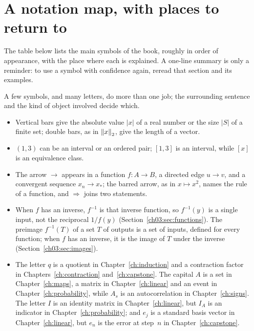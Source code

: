 \section{A notation map, with places to return to}\label{appC:sec:notation}
The table below lists the main symbols of the book, roughly in order of appearance, with the place where each is explained. A one-line summary is only a reminder: to use a symbol with confidence again, reread that section and its examples.

A few symbols, and many letters, do more than one job; the surrounding sentence and the kind of object involved decide which.
\begin{itemize}
\item Vertical bars give the absolute value $|x|$ of a real number or the size $|S|$ of a finite set; double bars, as in $\left\|x\right\|_2$, give the length of a vector.
\item $(1,3)$ can be an interval or an ordered pair; $[1,3]$ is an interval, while $[x]$ is an equivalence class.
\item The arrow $\to$ appears in a function $f:A\to B$, a directed edge $u\to v$, and a convergent sequence $x_n\to x_*$; the barred arrow, as in $x\mapsto x^2$, names the rule of a function, and $\Rightarrow$ joins two statements.
\item When $f$ has an inverse, $f^{-1}$ is that inverse function, so $f^{-1}(y)$ is a single input, not the reciprocal $1/f(y)$ (Section~\ref{ch03:sec:functions}). The preimage $f^{-1}(T)$ of a set $T$ of outputs is a set of inputs, defined for every function; when $f$ has an inverse, it is the image of $T$ under the inverse (Section~\ref{ch03:sec:images}).
\item The letter $q$ is a quotient in Chapter~\ref{ch:induction} and a contraction factor in Chapters~\ref{ch:contraction} and~\ref{ch:capstone}. The capital $A$ is a set in Chapter~\ref{ch:maps}, a matrix in Chapter~\ref{ch:linear} and an event in Chapter~\ref{ch:probability}, while $A_s$ is an autocorrelation in Chapter~\ref{ch:signs}. The letter $I$ is an identity matrix in Chapter~\ref{ch:linear}, but $I_A$ is an indicator in Chapter~\ref{ch:probability}; and $e_j$ is a standard basis vector in Chapter~\ref{ch:linear}, but $e_n$ is the error at step~$n$ in Chapter~\ref{ch:capstone}.
\end{itemize}

